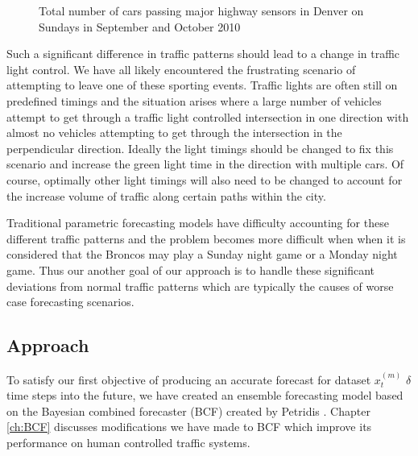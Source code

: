 \begin{figure}[!ht]
	\begin{center}
	\end{center}
	\caption{Total number of cars passing major highway sensors in Denver on Sundays in September and October 2010}
	\label{fig:broncos}
\end{figure}

Such a significant difference in traffic patterns should lead to a change in traffic light control.  We have all likely encountered the frustrating scenario of attempting to leave one of these sporting events.  Traffic lights are often still on predefined timings and the situation arises where a large number of vehicles attempt to get through a traffic light controlled intersection in one direction with almost no vehicles attempting to get through the intersection in the perpendicular direction.  Ideally the light timings should be changed to fix this scenario and increase the green light time in the direction with multiple cars.  Of course, optimally other light timings will also need to be changed to account for the increase volume of traffic along certain paths within the city.

Traditional parametric forecasting models have difficulty accounting for these different traffic patterns and the problem becomes more difficult when when it is considered that the Broncos may play a Sunday night game or a Monday night game.  Thus our another goal of our approach is to handle these significant deviations from normal traffic patterns which are typically the causes of worse case forecasting scenarios.


\subsection{Approach}
To satisfy our first objective of producing an accurate forecast for dataset $x_{t}^{(m)}$ $\delta$ time steps into the future, we have created an ensemble forecasting model based on the Bayesian combined forecaster (BCF) created by Petridis \cite{Petridis2001}.  Chapter \ref{ch:BCF} discusses modifications we have made to BCF which improve its performance on human controlled traffic systems.  

